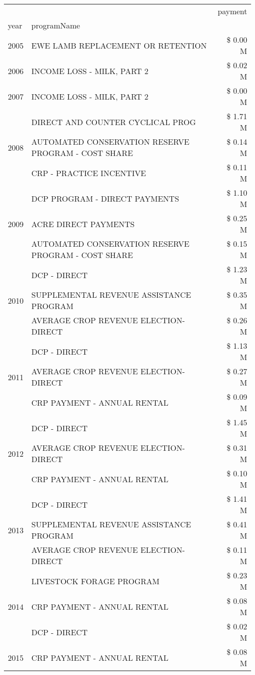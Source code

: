 \begin{tabular}{llr}
\toprule
 &  & payment \\
year & programName &  \\
\midrule
2005 & EWE LAMB REPLACEMENT OR RETENTION & \$ 0.00 M \\
\cline{1-3}
2006 & INCOME LOSS - MILK, PART 2 & \$ 0.02 M \\
\cline{1-3}
2007 & INCOME LOSS - MILK, PART 2 & \$ 0.00 M \\
\cline{1-3}
\multirow[t]{3}{*}{2008} & DIRECT AND COUNTER CYCLICAL PROG & \$ 1.71 M \\
 & AUTOMATED CONSERVATION RESERVE PROGRAM - COST SHARE & \$ 0.14 M \\
 & CRP - PRACTICE INCENTIVE & \$ 0.11 M \\
\cline{1-3}
\multirow[t]{3}{*}{2009} & DCP PROGRAM - DIRECT PAYMENTS & \$ 1.10 M \\
 & ACRE DIRECT PAYMENTS & \$ 0.25 M \\
 & AUTOMATED CONSERVATION RESERVE PROGRAM - COST SHARE & \$ 0.15 M \\
\cline{1-3}
\multirow[t]{3}{*}{2010} & DCP - DIRECT & \$ 1.23 M \\
 & SUPPLEMENTAL REVENUE ASSISTANCE PROGRAM & \$ 0.35 M \\
 & AVERAGE CROP REVENUE ELECTION-DIRECT & \$ 0.26 M \\
\cline{1-3}
\multirow[t]{3}{*}{2011} & DCP - DIRECT & \$ 1.13 M \\
 & AVERAGE CROP REVENUE ELECTION-DIRECT & \$ 0.27 M \\
 & CRP PAYMENT - ANNUAL RENTAL & \$ 0.09 M \\
\cline{1-3}
\multirow[t]{3}{*}{2012} & DCP - DIRECT & \$ 1.45 M \\
 & AVERAGE CROP REVENUE ELECTION-DIRECT & \$ 0.31 M \\
 & CRP PAYMENT - ANNUAL RENTAL & \$ 0.10 M \\
\cline{1-3}
\multirow[t]{3}{*}{2013} & DCP - DIRECT & \$ 1.41 M \\
 & SUPPLEMENTAL REVENUE ASSISTANCE PROGRAM & \$ 0.41 M \\
 & AVERAGE CROP REVENUE ELECTION-DIRECT & \$ 0.11 M \\
\cline{1-3}
\multirow[t]{3}{*}{2014} & LIVESTOCK FORAGE PROGRAM & \$ 0.23 M \\
 & CRP PAYMENT - ANNUAL RENTAL & \$ 0.08 M \\
 & DCP - DIRECT & \$ 0.02 M \\
\cline{1-3}
\multirow[t]{3}{*}{2015} & CRP PAYMENT - ANNUAL RENTAL & \$ 0.08 M \\

\end{tabular}
